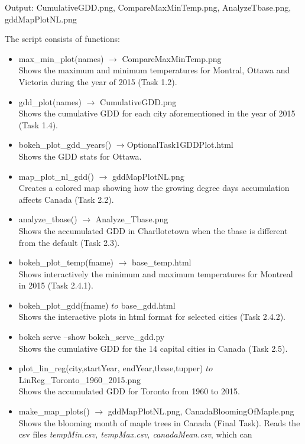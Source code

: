 \documentclass[12pt]{article}
\begin{document}
\begin{description}
\item[create\_plots.py]
\item Output: CumulativeGDD.png, CompareMaxMinTemp.png, AnalyzeTbase.png, gddMapPlotNL.png
\item The script consists of functions:
\begin{itemize}
\item max\_min\_plot(names) $\to$ CompareMaxMinTemp.png \\
Shows the maximum and minimum temperatures for Montral, Ottawa and Victoria during the year of 2015 (Task 1.2).
\item gdd\_plot(names)  $\to$ CumulativeGDD.png \\
Shows the cumulative GDD for each city aforementioned in the year of 2015 (Task 1.4).
\item bokeh_plot_gdd_years() $\to$OptionalTask1GDDPlot.html \\
Shows the GDD stats for Ottawa. 
\item map\_plot\_nl\_gdd()  $\to$  gddMapPlotNL.png \\
Creates a colored map showing how the growing degree days accumulation affects Canada (Task 2.2).
\item analyze\_tbase()  $\to$ Analyze\_Tbase.png \\
Shows the accumulated GDD in Charllotetown when the tbase is different from the default (Task 2.3).
\item bokeh\_plot\_temp(fname) $\to$ base_temp.html \\
Shows interactively the minimum and maximum temperatures for Montreal in 2015 (Task 2.4.1).
\item bokeh\_plot\_gdd(fname) $to$ base_gdd.html \\
Shows the interactive plots in html format for selected cities (Task 2.4.2).
\item bokeh serve --show bokeh_serve_gdd.py \\
Shows the cumulative GDD for the 14 capital cities in Canada (Task 2.5).
\item plot_lin_reg(city,startYear, endYear,tbase,tupper) $to$ LinReg_Toronto_1960_2015.png \\
Shows the accumulated GDD for Toronto from 1960 to 2015.
\item make\_map\_plots() $\to$ gddMapPlotNL.png, CanadaBloomingOfMaple.png \\
Shows the blooming month of maple trees in Canada (Final Task).
Reads the csv files \emph{tempMin.csv, tempMax.csv, canadaMean.csv}, which can 

\end{itemize}
\end{description}
\end{document}
